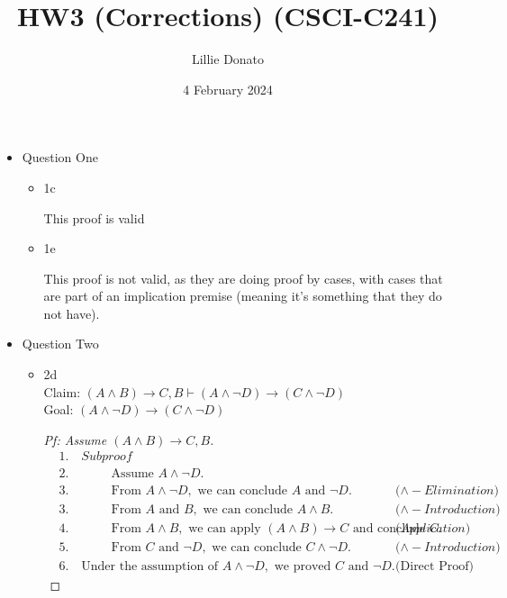 \documentclass{article}
\title{HW3 (Corrections) (CSCI-C241)}
\author{Lillie Donato}
\date{4 February 2024}
\begin{document}
\maketitle

\begin{itemize}
    \item Question One
    \begin{itemize}
        \item 1c
        
        This proof is valid
        \item 1e
        
        This proof is not valid, as they are doing proof by cases, with cases that are part of an implication premise (meaning it's something that they do not have).
    \end{itemize}

    \item Question Two
    \begin{itemize}
        \item
        2d \\
        Claim: $(A \land B) \rightarrow C, B \vdash (A \land \neg D) \rightarrow (C \land \neg D)$ \\
        Goal: $(A \land \neg D) \rightarrow (C \land \neg D)$
        \begin{proof}[Pf: Assume $(A \land B) \rightarrow C, B$]
            \begin{align*}
                &1. \quad Subproof \\
                &2. \quad \hspace{1cm} \text{Assume } A \land \neg D. \\
                &3. \quad \hspace{1cm} \text{From } A \land \neg D, \text{ we can conclude } A \text{ and } \neg D. && \text{($\land - Elimination$)} \\
                &3. \quad \hspace{1cm} \text{From } A \text{ and } B, \text{ we can conclude } A \land B. && \text{($\land - Introduction$)} \\
                &4. \quad \hspace{1cm} \text{From } A \land B, \text{ we can apply } (A \land B) \rightarrow C \text{ and conclude } C. && \text{($Application$)} \\
                &5. \quad \hspace{1cm} \text{From } C \text{ and } \neg D, \text{ we can conclude } C \land \neg D. && \text{($\land - Introduction$)} \\
                &6. \quad \text{Under the assumption of } A \land \neg D, \text{ we proved } C \text{ and } \neg D. && \text{(Direct Proof)}
            \end{align*}
        \end{proof}
        

\end{itemize}
\end{itemize}
\end{document}
